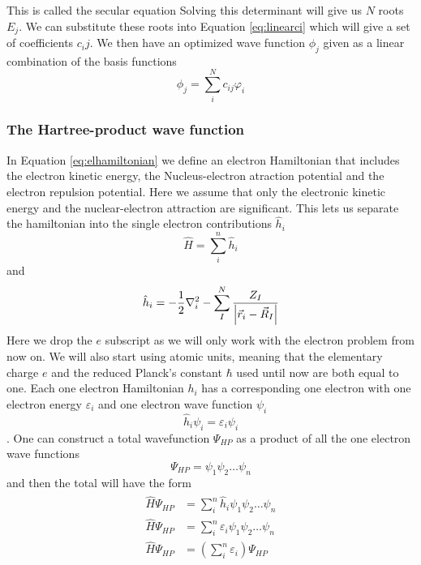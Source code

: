 \documentclass[../master_thesis.tex]{subfiles}
\begin{document}
This is called the secular equation \cite{Cramer:2004} Solving this determinant
will give us $N$ roots $E_j$. We can substitute these roots into Equation
\ref{eq:linearci} which will give a set of coefficients $c_ij$. We then have an
optimized wave function $\phi_j$ given as a linear combination of the basis functions
\begin{equation}
  \phi_j = \sum_{i}^N c_{ij}\varphi_i
\end{equation}

\subsubsection{The Hartree-product wave function} %
In Equation \ref{eq:elhamiltonian} we define an electron Hamiltonian that includes
the electron kinetic energy, the Nucleus-electron atraction potential and the
electron repulsion potential. Here we assume that only the electronic kinetic energy and
the nuclear-electron attraction are significant. This lets us separate the hamiltonian into
the single electron contributions $\hat{h}_i$
\begin{equation}
  \hat{H} = \sum^n_{i} \hat{h}_i
\end{equation}
and
\begin{equation}
  \hat{h}_i = -\frac{1}{2}\nabla^2_i - \sum^N_I \frac{Z_I}{\abs{\vec{r}_i - \vec{R}_I}}
\end{equation}
Here we drop the $e$ subscript as we will only work with the electron problem
from now on. We will also start using atomic units, meaning that the elementary charge $e$ and
the reduced Planck's constant $\hbar$ used until now are both equal to one.
Each one electron Hamiltonian $h_i$ has a corresponding one electron \SE with
one electron energy $\varepsilon_i$ and one electron wave function $\psi_i$
\begin{equation}
  \hat{h}_i\psi_i = \varepsilon_i\psi_i
\end{equation}.
One can construct a total wavefunction $\Psi_{HP}$ as a product of all the one electron
wave functions
\begin{equation}
  \Psi_{HP} = \psi_1\psi_2\ldots\psi_n
\end{equation}
and then the total \SE  will have the form \cite{Cramer:2004}
\begin{align}
  \begin{split}
    \hat{H}\Psi_{HP} &= \sum^n_{i} \hat{h}_i\psi_1\psi_2\ldots\psi_n\\
    \hat{H}\Psi_{HP} &= \sum_i^n\varepsilon_i\psi_1\psi_2\ldots\psi_n\\
    \hat{H}\Psi_{HP} &= \left(\sum_i^n\varepsilon_i\right)\Psi_{HP}
  \end{split}
\end{align}
\end{document}

